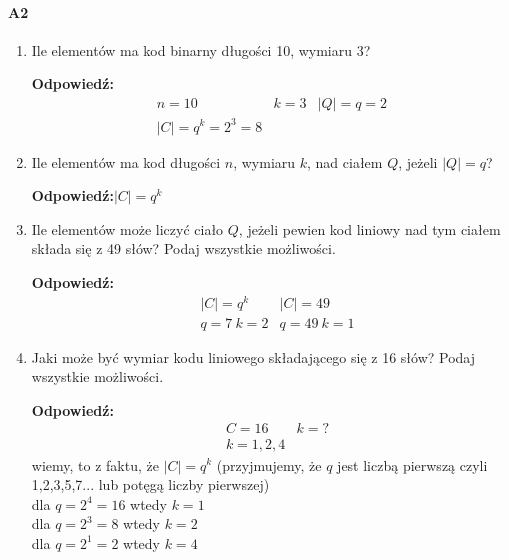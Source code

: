 \paragraph{A2}
\begin{enumerate}[label=\alph*)]
\item Ile elementów ma kod binarny długości 10, wymiaru 3?

\textbf{Odpowiedź:}
\begin{align*}
&n=10&k=3&|Q|=q=2&\\
&|C|=q^k=2^3=8
\end{align*}
\item Ile elementów ma kod długości $n$, wymiaru $k$, nad ciałem $Q$, jeżeli $|Q| = q$?

\textbf{Odpowiedź:}$|C|=q^k$
\item Ile elementów może liczyć ciało $Q$, jeżeli pewien kod liniowy nad tym ciałem składa się z 49 słów? Podaj wszystkie możliwości.

\textbf{Odpowiedź:}
\begin{align*}
&|C|=q^k&|C|=49\\
&q=7\ k=2& q=49\ k=1
\end{align*}
\item Jaki może być wymiar kodu liniowego składającego się z 16 słów? Podaj wszystkie możliwości.

\textbf{Odpowiedź:}
\begin{align*}
&C=16&k=?\\
&k=1,2,4
\end{align*}
wiemy, to z faktu, że $|C|=q^k$ (przyjmujemy, że $q$ jest liczbą pierwszą czyli 1,2,3,5,7... lub potęgą liczby pierwszej)\\
dla $q=2^4=16$ wtedy $k=1$\\
dla $q=2^3=8$ wtedy  $k=2$\\
dla $q=2^1=2$ wtedy $k=4$
\end{enumerate}

